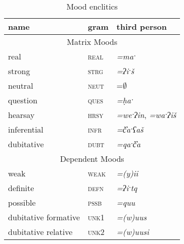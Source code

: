 \begin{table}[ht]
\centering
\caption{Mood enclitics}
\label{table:moods}
\begin{tabular}{lll}
name                                       & gram                         & third person                           \\ \hline
\multicolumn{3}{|c|}{Matrix Moods}       \\ \hline
\multicolumn{1}{|l|}{real}               & \multicolumn{1}{l|}{\textsc{real}} & \multicolumn{1}{l|}{\textit{=maˑ}}             \\ \hline
\multicolumn{1}{|l|}{strong}                 & \multicolumn{1}{l|}{\textsc{strg}} & \multicolumn{1}{l|}{\textit{=ʔiˑš}}            \\ \hline
\multicolumn{1}{|l|}{neutral}              & \multicolumn{1}{l|}{\textsc{neut}} & \multicolumn{1}{l|}{=$\emptyset$\footnotemark}       \\ \hline
\multicolumn{1}{|l|}{question}             & \multicolumn{1}{l|}{\textsc{ques}} & \multicolumn{1}{l|}{\textit{=ḥaˑ}}             \\ \hline
\multicolumn{1}{|l|}{hearsay}              & \multicolumn{1}{l|}{\textsc{hrsy}} & \multicolumn{1}{l|}{\textit{=weˑʔin}, \textit{=waˑʔiš}} \\ \hline
\multicolumn{1}{|l|}{inferential}        & \multicolumn{1}{l|}{\textsc{infr}} & \multicolumn{1}{l|}{\textit{=č̓aˑʕaš}}        \\ \hline
\multicolumn{1}{|l|}{dubitative}           & \multicolumn{1}{l|}{\textsc{dubt}} & \multicolumn{1}{l|}{\textit{=qaˑč̓a}}          \\ \hline
\multicolumn{3}{|c|}{Dependent Moods} \\ \hline
\multicolumn{1}{|l|}{weak}                 & \multicolumn{1}{l|}{\textsc{weak}} & \multicolumn{1}{l|}{\textit{=(y)ii}}            \\ \hline
\multicolumn{1}{|l|}{definite}             & \multicolumn{1}{l|}{\textsc{defn}} & \multicolumn{1}{l|}{\textit{=ʔiˑtq}}            \\ \hline
\multicolumn{1}{|l|}{possible}             & \multicolumn{1}{l|}{\textsc{pssb}} & \multicolumn{1}{l|}{\textit{=quu}}              \\ \hline
\multicolumn{1}{|l|}{dubitative formative} & \multicolumn{1}{l|}{\textsc{unk1}} & \multicolumn{1}{l|}{\textit{=(w)uus}}           \\ \hline
\multicolumn{1}{|l|}{dubitative relative}  & \multicolumn{1}{l|}{\textsc{unk2}} & \multicolumn{1}{l|}{\textit{=(w)uusi}}          \\ \hline

\end{tabular}
\end{table}

